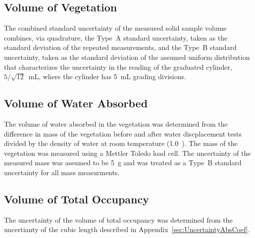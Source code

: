\documentclass[12pt]{article}
\begin{document}
\subsection{Volume of Vegetation}
\label{ssec:VVegUncertainty}
The combined standard uncertainty of the measured solid sample volume combines, via quadrature, the Type~A standard uncertainty, taken as the standard deviation of the repeated measurements, and the Type~B standard uncertainty, taken as the standard deviation of the assumed uniform distribution that characterizes the uncertainty in the reading of the graduated cylinder, $5/\sqrt{12}$~mL, where the cylinder has 5~mL grading divisions.

\subsection{Volume of Water Absorbed}
\label{ssec:VWaterAbsorbedUncertainty}
The volume of water absorbed in the vegetation was determined from the difference in mass of the vegetation before and after water discplacement tests divided by the density of water at room temperature (1.0~\si{}). The mass of the vegetation was measured using a Mettler Toledo load cell. The uncertainty of the measured mass was assumed to be 5~\si{g} and was treated as a Type~B standard uncertainty for all mass measurments. 

\subsection{Volume of Total Occupancy}
\label{ssec:VWaterAbsorbedUncertainty}
The uncertainty of the volume of total occupancy was determined from the uncertianty of the cubic length described in Appendix~\ref{sec:UncertaintyAbsCoef}.
\end{document}

